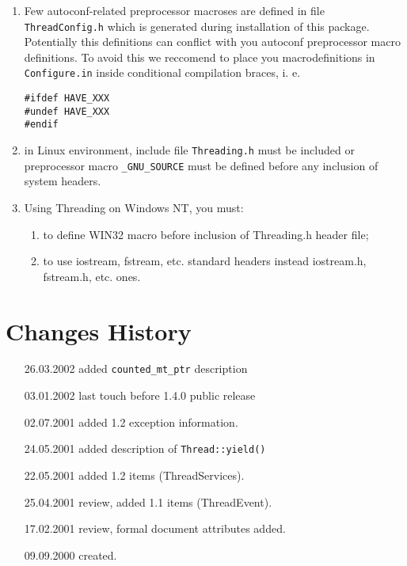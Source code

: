 \documentclass[10pt]{article}
\begin{document}
\begin{enumerate}
  \item Few autoconf-related preprocessor macroses are defined in file 
  \verb|ThreadConfig.h| which is generated during installation of this package.
  Potentially this definitions can conflict with you autoconf preprocessor
  macro definitions. To avoid this we reccomend to place you macrodefinitions
  in \verb|Configure.in| inside conditional compilation braces, i. e.
\begin{verbatim}
#ifdef HAVE_XXX
#undef HAVE_XXX
#endif
\end{verbatim}
  \item in Linux environment, include file \verb|Threading.h| must be
 included or preprocessor macro \verb|_GNU_SOURCE| must be
 defined before any inclusion of system headers.
  \item Using Threading on Windows NT, you must:
    \begin{enumerate}
      \item to define WIN32 macro before inclusion of Threading.h header file;
      \item to use iostream, fstream, etc. standard headers instead iostream.h, fstream.h, etc. ones.
    \end{enumerate}
\end{enumerate}

\section{ Changes History }

\begin{itemize}
  \item[26.03.2002]  added \verb|counted_mt_ptr| description
  \item[03.01.2002]  last touch before 1.4.0 public release
  \item[02.07.2001]  added 1.2 exception information.
  \item[24.05.2001]  added description of \verb|Thread::yield()|
  \item[22.05.2001]  added 1.2 items (ThreadServices).
  \item[25.04.2001]  review, added 1.1 items (ThreadEvent).
  \item[17.02.2001]  review, formal document attributes added.
  \item[09.09.2000]  created.
\end{itemize}
 
 
\end{document}
